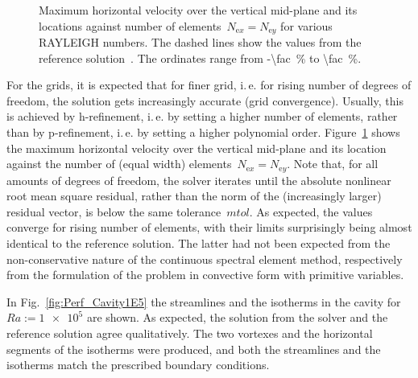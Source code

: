 \documentclass[10pt, ngerman, english,
twoside, open=right,
numbers=noenddot,
declaration=section,
abstract=section,
abstract=multiple,
abstract=notoc,
declaration=notoc,
cd=pale, 
chapterprefix=off, 
chapterpage=false, 
headingsvskip=-10em,
cdgeometry=custom, 
slantedgreek=on,
cdmath=on, 
cdfont=on,
ttfont=false,
mathswap=off,
]{tudscrreprt}
\numberwithin{equation}{chapter}
\renewcommand{\textsc}[1]{\uppercase{\mbox{#1}}}
\newcommand{\sidenote}[1]{
  \leavevmode %
  \marginpar{\hyphenpenalty=1000 \flushleft{\textcolor{HKS41}{#1}}}}
\begin{document}
\begin{figure}[!b]
\centering

\caption{Maximum horizontal velocity over the vertical mid-plane and its locations against number of elements~$N_{\text{e}x}=N_{\text{e}y}$ for various \textsc{Rayleigh} numbers. The dashed lines show the values from the reference solution~\cite[Tab.~V]{DeVahl}. The ordinates range from \SI{-\fac}{\percent} to \SI{\fac}{\percent}.}\label{fig:Perf_verifyN}
\end{figure}
\sidenote{Accuracy}For the grids, it is expected that for finer grid, i.\,e. for rising number of degrees of freedom, the solution gets increasingly accurate (grid convergence). Usually, this is achieved by h-refinement, i.\,e. by setting a higher number of elements, rather than by p-refinement, i.\,e. by setting a higher polynomial order.
Figure~\ref{fig:Perf_verifyN} shows the maximum horizontal velocity over the vertical mid-plane and its location against the number of (equal width) elements~$N_{\text{e}x}=N_{\text{e}y}$.
Note that, for all amounts of degrees of freedom, the solver iterates until the absolute nonlinear root mean square residual, rather than the norm of the (increasingly larger) residual vector, is below the same tolerance~$mtol$.
As expected, the values converge for rising number of elements, with their limits surprisingly being almost identical to the reference solution. The latter had not been expected from the non-conservative nature of the continuous spectral element method, respectively from the formulation of the problem in convective form with primitive variables.\par
\sidenote{Qualitatively}In Fig.~\ref{fig:Perf_Cavity1E5} the streamlines and the isotherms in the cavity for~$Ra:=\num{1e5}$ are shown. As expected, the solution from the solver and the reference solution agree qualitatively. The two vortexes and the horizontal segments of the isotherms were produced, and both the streamlines and the isotherms match the prescribed boundary conditions.\par
\end{document}
